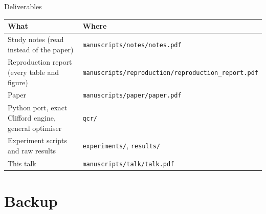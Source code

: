 \documentclass[aspectratio=169,10pt]{beamer}
\begin{document}
\begin{frame}{Deliverables}
  \small\renewcommand{\arraystretch}{1.25}
  \begin{tabularx}{\textwidth}{@{}p{}X@{}}
    \toprule
    \textbf{What} & \textbf{Where}\\\midrule
    Study notes (read instead of the paper) & \texttt{manuscripts/notes/notes.pdf}\\
    Reproduction report (every table and figure) & \texttt{manuscripts/reproduction/reproduction\_report.pdf}\\
    Paper & \texttt{manuscripts/paper/paper.pdf}\\
    Python port, exact Clifford engine, general optimiser & \texttt{qcr/}\\
    Experiment scripts and raw results & \texttt{experiments/}, \texttt{results/}\\
    This talk & \texttt{manuscripts/talk/talk.pdf}\\\bottomrule
  \end{tabularx}
  \vfill
\end{frame}

\appendix
\section{Backup}
{
\begin{frame}[plain]
\end{frame}}
\end{document}

